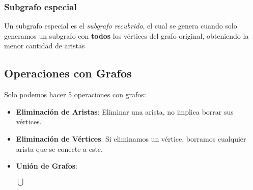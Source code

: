 \subsubsection{Subgrafo especial}
Un subgrafo especial es el \textit{subgrafo recubrido}, el cual se genera cuando solo generamos un subgrafo con \textbf{todos} los vértices del grafo original, obteniendo la menor cantidad de aristas
\subsection{Operaciones con Grafos}
Solo podemos hacer 5 operaciones con grafos:
\begin{itemize}
        \item \textbf{Eliminación de Aristas}: Eliminar una arista, no implica borrar sus vértices.
        \item \textbf{Eliminación de Vértices}: Si eliminamos un vértice, borramos cualquier arista que se conecte a este.
        \item \textbf{Unión de Grafos}: \par

              \begin{minipage}{.2\textwidth}
              \end{minipage}
              \(\bigcup \)
              \begin{minipage}{.2\textwidth}
\end{minipage}
\end{itemize}
